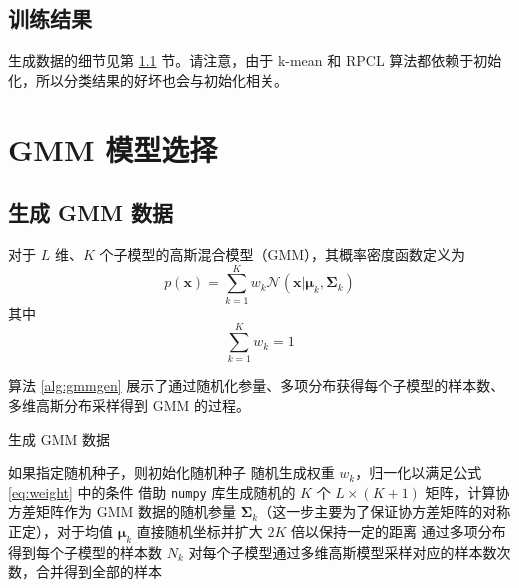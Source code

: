         \subsection{训练结果}
        
        生成数据的细节见第 \ref{sec:datagen} 节。请注意，由于 k-mean 和 RPCL 算法都依赖于初始化，所以分类结果的好坏也会与初始化相关。



    \section{GMM 模型选择}

    \subsection{生成 GMM 数据}\label{sec:datagen}

    对于 $L$ 维、$K$ 个子模型的高斯混合模型（GMM），其概率密度函数定义为
    \begin{equation}
        p(\bm{x}) = \sum_{k=1}^K w_k \mathcal{N}(\bm{x}|\bm{\mu}_k,\bm{\Sigma}_k)
    \end{equation}
    其中
    \begin{equation}\label{eq:weight}
        \sum_{k=1}^K w_k = 1
    \end{equation}

    算法 \ref{alg:gmmgen} 展示了通过随机化参量、多项分布获得每个子模型的样本数、多维高斯分布采样得到 GMM 的过程\cite{gmmgen}。

    \begin{algorithm}
        \caption{生成 GMM 数据}\label{alg:gmmgen}
        如果指定随机种子，则初始化随机种子\;
        随机生成权重 $w_k$，归一化以满足公式 \eqref{eq:weight} 中的条件\;
        借助 \verb"numpy" 库生成随机的 $K$ 个 $L\times (K+1)$ 矩阵，计算协方差矩阵作为 GMM 数据的随机参量 $\bm{\Sigma}_k$（这一步主要为了保证协方差矩阵的对称正定\cite{multinorm}），对于均值 $\bm{\mu}_k$ 直接随机坐标并扩大 $2K$ 倍以保持一定的距离\;
        通过多项分布得到每个子模型的样本数 $N_k$\;
        对每个子模型通过多维高斯模型采样对应的样本数次数，合并得到全部的样本\;
    \end{algorithm}
    

    
